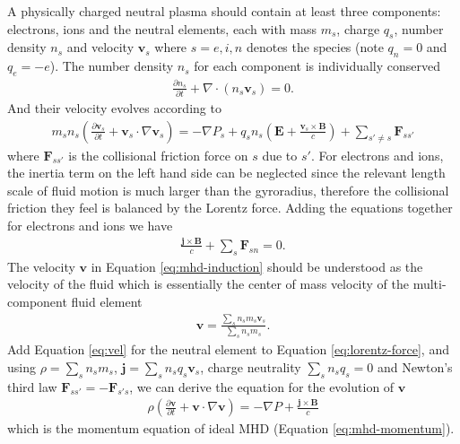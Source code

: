 A physically charged neutral plasma should contain at least three components: electrons, ions and the neutral elements, each with mass $m_s$, charge $q_s$, number density $n_s$ and velocity $\boldsymbol{v}_s$ where $s=e,i,n$ denotes the species (note $q_n=0$ and $q_e=-e$).
The number density $n_s$ for each component is individually conserved
\begin{eqnarray}
	\frac{\partial n_s}{\partial t} + \nabla\cdot (n_s \boldsymbol{v}_s) = 0.
\end{eqnarray}
And their velocity evolves according to
\begin{eqnarray}\label{eq:vel}
		m_s n_s \left(\frac{\partial \boldsymbol{v}_s}{\partial t} + \boldsymbol{v}_s\cdot \nabla \boldsymbol{v}_s\right) = -\nabla P_s +q_s n_s \left(\boldsymbol{E} + \frac{ \boldsymbol{v}_s\times \boldsymbol{B}}{c}\right) + \sum\limits_{s'\neq s}\boldsymbol{F}_{s s'}
\end{eqnarray}
where $\boldsymbol{F}_{s s'}$ is the collisional friction force on $s$ due to $s'$.
For electrons and ions, the inertia term on the left hand side can be neglected since the relevant length scale of fluid motion is much larger than the gyroradius, therefore the collisional friction they feel is balanced by the Lorentz force.
Adding the equations together for electrons and ions we have
\begin{eqnarray}\label{eq:lorentz-force}
	\frac{\boldsymbol{j}\times\boldsymbol{B}}{c} + \sum\limits_s\boldsymbol{F}_{sn} = 0.
\end{eqnarray}
The velocity $\boldsymbol{v}$ in Equation \ref{eq:mhd-induction} should be understood as the velocity of the fluid which is essentially the center of mass velocity of the multi-component fluid element
\begin{eqnarray}
	\boldsymbol{v} = \frac{\sum\limits_s n_s m_s \boldsymbol{v}_s}{\sum\limits_s n_s m_s}.
\end{eqnarray}
Add Equation \ref{eq:vel} for the neutral element to Equation \ref{eq:lorentz-force}, and using $\rho = \sum\limits_s n_s m_s$, $\boldsymbol{j} = \sum\limits_s n_s q_s\boldsymbol{v}_s$, charge neutrality $\sum\limits_s n_s q_s = 0$ and Newton's third law $\boldsymbol{F}_{s s'}=-\boldsymbol{F}_{s' s}$, we can derive the equation for the evolution of $\boldsymbol{v}$
\begin{eqnarray}
	\rho \left(\frac{\partial \boldsymbol{v}}{\partial t} + \boldsymbol{v}\cdot \nabla \boldsymbol{v}\right) = -\nabla P +\frac{ \boldsymbol{j}\times \boldsymbol{B}}{c} 
\end{eqnarray}
which is the momentum equation of ideal MHD (Equation \ref{eq:mhd-momentum}).

